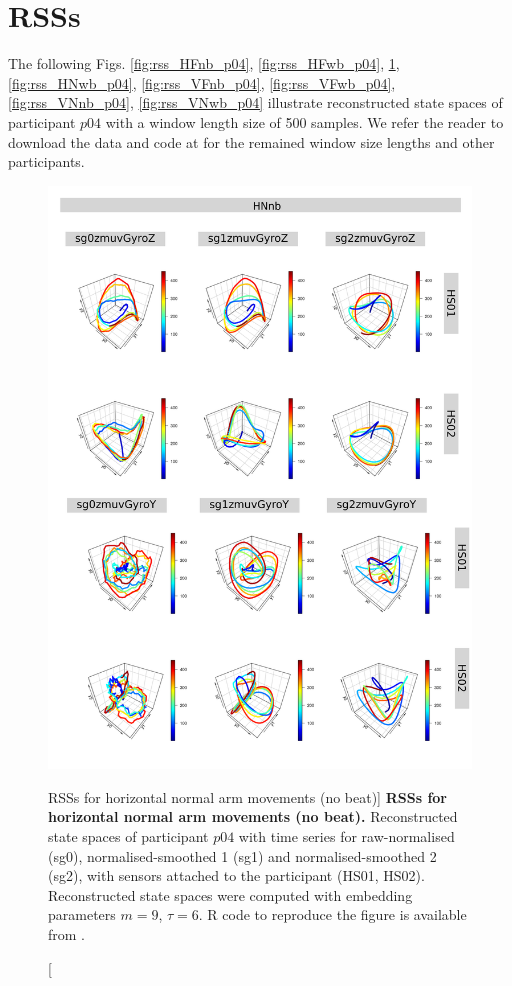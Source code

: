 \newpage
\section{RSSs} \label{appendix:d:rsss}

The following Figs.  
\ref{fig:rss_HFnb_p04},
\ref{fig:rss_HFwb_p04},
\ref{fig:rss_HNnb_p04},
\ref{fig:rss_HNwb_p04},
\ref{fig:rss_VFnb_p04},
\ref{fig:rss_VFwb_p04},
\ref{fig:rss_VNnb_p04},
\ref{fig:rss_VNwb_p04} 
illustrate reconstructed state spaces 
of participant $p04$ with a window length size of 500 samples.
We refer the reader to download the data and code at \cite{xochicale2018}
for the remained window size lengths and other participants.




\begin{figure}
\centering
\includegraphics[height=0.8\textheight]{rss_HNnb_p04}
\caption
	[RSSs for horizontal normal arm movements (no beat)]{
	{\bf RSSs for horizontal normal arm movements (no beat).}
	Reconstructed state spaces of participant $p04$
	with time series for raw-normalised (sg0), 
	normalised-smoothed 1 (sg1) and 
	normalised-smoothed 2 (sg2), 
	with sensors attached to the participant (HS01, HS02).
	Reconstructed state spaces were computed with 
	embedding parameters $m=9$, $\tau=6$.
	R code to reproduce the figure is available from \cite{xochicale2018}.
        }
     \label{fig:rss_HNnb_p04}
\end{figure}
